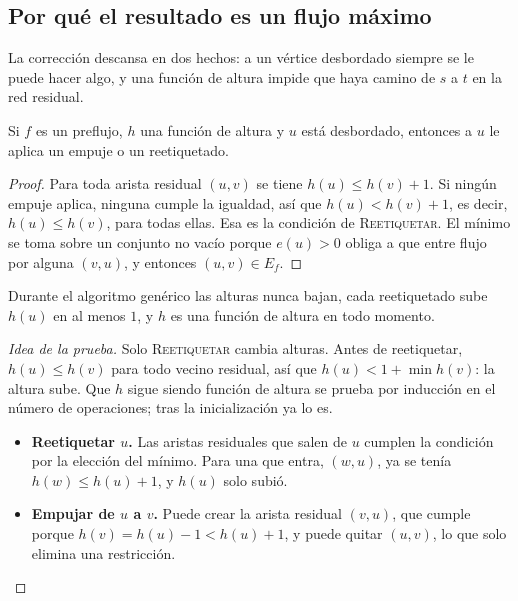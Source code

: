 \documentclass[11pt,letterpaper]{article}
\begin{document}

\subsection*{Por qué el resultado es un flujo máximo}

La corrección descansa en dos hechos: a un vértice desbordado siempre
se le puede hacer algo, y una función de altura impide que haya camino
de $s$ a $t$ en la red residual.

\begin{lema}
  \label{lem:push-siempre-aplica}
  Si $f$ es un preflujo, $h$ una función de altura y $u$ está
  desbordado, entonces a $u$ le aplica un empuje o un reetiquetado.
\end{lema}

\begin{proof}
  Para toda arista residual $(u, v)$ se tiene $h(u) \le h(v) + 1$. Si
  ningún empuje aplica, ninguna cumple la igualdad, así que
  $h(u) < h(v) + 1$, es decir, $h(u) \le h(v)$, para todas ellas. Esa
  es la condición de \textsc{Reetiquetar}. El mínimo se toma sobre un
  conjunto no vacío porque $e(u) > 0$ obliga a que entre flujo por
  alguna $(v, u)$, y entonces $(u, v) \in E_f$.
\end{proof}

\begin{lema}
  \label{lem:push-altura-valida}
  Durante el algoritmo genérico las alturas nunca bajan, cada
  reetiquetado sube $h(u)$ en al menos $1$, y $h$ es una función de
  altura en todo momento.
\end{lema}

\begin{proof}[Idea de la prueba]
  Solo \textsc{Reetiquetar} cambia alturas. Antes de reetiquetar,
  $h(u) \le h(v)$ para todo vecino residual, así que
  $h(u) < 1 + \min h(v)$: la altura sube. Que $h$ sigue siendo
  función de altura se prueba por inducción en el número de
  operaciones; tras la inicialización ya lo es.
  \begin{itemize}
    \item \textbf{Reetiquetar $u$.} Las aristas residuales que salen de
          $u$ cumplen la condición por la elección del mínimo. Para una
          que entra, $(w, u)$, ya se tenía $h(w) \le h(u) + 1$, y
          $h(u)$ solo subió.
    \item \textbf{Empujar de $u$ a $v$.} Puede crear la arista residual
          $(v, u)$, que cumple porque $h(v) = h(u) - 1 < h(u) + 1$, y
          puede quitar $(u, v)$, lo que solo elimina una restricción.
          \qedhere
  \end{itemize}
\end{proof}
\end{document}
